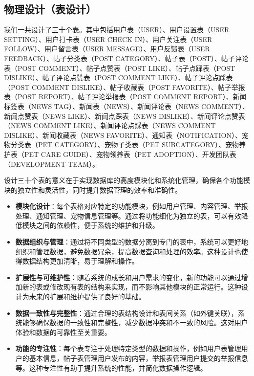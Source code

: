 \subsection{物理设计（表设计）}

我们一共设计了三十个表。其中包括用户表（USER）、用户设置表（USER SETTING）、用户打卡表（USER CHECK IN）、用户关注表（USER FOLLOW）、用户留言表（USER MESSAGE）、用户反馈表（USER FEEDBACK）、帖子分类表（POST CATEGORY）、帖子表（POST）、帖子评论表（POST COMMENT）、帖子点赞表（POST LIKE）、帖子点踩表（POST DISLIKE）、帖子评论点赞表（POST COMMENT LIKE）、帖子评论点踩表（POST COMMENT DISLIKE）、帖子收藏表（POST FAVORITE）、帖子举报表（POST REPORT）、帖子评论举报表（POST COMMENT REPORT）、新闻标签表（NEWS TAG）、新闻表（NEWS）、新闻评论表（NEWS COMMENT）、新闻点赞表（NEWS LIKE）、新闻点踩表（NEWS DISLIKE）、新闻评论点赞表（NEWS COMMENT LIKE）、新闻评论点踩表（NEWS COMMENT DISLIKE）、新闻收藏表（NEWS FAVORITE）、通知表（NOTIFICATION）、宠物分类表（PET CATEGORY）、宠物子类表（PET SUBCATEGORY）、宠物养护表（PET CARE GUIDE）、宠物领养表（PET ADOPTION）、开发团队表（DEVELOPMENT TEAM）。

设计三十个表的意义在于实现数据库的高度模块化和系统化管理，确保各个功能模块的独立性和灵活性，同时提升数据管理的效率和准确性。

\begin{itemize}
	\item \textbf{模块化设计}：每个表格对应特定的功能模块，例如用户管理、内容管理、举报处理、通知管理、宠物信息管理等。通过将功能细化为独立的表，可以有效降低模块之间的依赖性，便于系统的维护和升级。
	
	\item \textbf{数据组织与管理}：通过将不同类型的数据分离到专门的表中，系统可以更好地组织和管理数据，避免数据冗余，提高数据查询和处理的效率。这种设计也使得数据结构更加清晰，易于理解和操作。
	
	\item \textbf{扩展性与可维护性}：随着系统的成长和用户需求的变化，新的功能可以通过增加新的表或修改现有表的结构来实现，而不影响其他模块的正常运行。这种设计为未来的扩展和维护提供了良好的基础。
	
	\item \textbf{数据一致性与完整性}：通过合理的表结构设计和表间关系（如外键关联），系统能够确保数据的一致性和完整性，减少数据冲突和不一致的风险。这对用户体验和数据的可靠性至关重要。
	
	\item \textbf{功能的专注性}：每个表专注于处理特定类型的数据和操作，例如用户表管理用户的基本信息，帖子表管理用户发布的内容，举报表管理用户提交的举报信息等。这种专注性有助于提升系统的性能，并简化数据操作逻辑。
\end{itemize}






